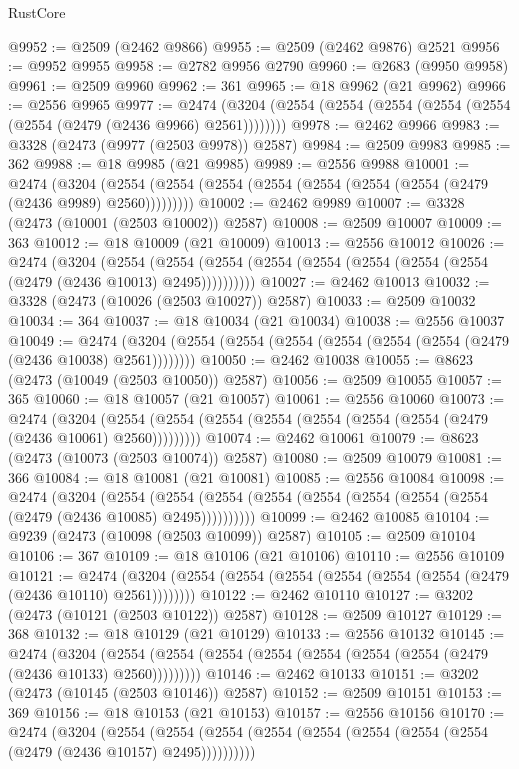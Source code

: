 \begin{lexlean}{RustCore}
\begin{coremodule}
@9952 := @2509 (@2462 @9866)
@9955 := @2509 (@2462 @9876) @2521
@9956 := @9952 @9955
@9958 := @2782 @9956 @2790
@9960 := @2683 (@9950 @9958)
@9961 := @2509 @9960
@9962 := 361
@9965 := @18 @9962 (@21 @9962)
@9966 := @2556 @9965
@9977 := @2474 (@3204 (@2554 (@2554 (@2554 (@2554 (@2554 (@2554 (@2479 (@2436 @9966) @2561))))))))
@9978 := @2462 @9966
@9983 := @3328 (@2473 (@9977 (@2503 @9978)) @2587)
@9984 := @2509 @9983
@9985 := 362
@9988 := @18 @9985 (@21 @9985)
@9989 := @2556 @9988
@10001 := @2474
    (@3204 (@2554 (@2554 (@2554 (@2554 (@2554 (@2554 (@2554 (@2479 (@2436 @9989) @2560)))))))))
@10002 := @2462 @9989
@10007 := @3328 (@2473 (@10001 (@2503 @10002)) @2587)
@10008 := @2509 @10007
@10009 := 363
@10012 := @18 @10009 (@21 @10009)
@10013 := @2556 @10012
@10026 := @2474
    (@3204
      (@2554 (@2554 (@2554 (@2554 (@2554 (@2554 (@2554 (@2554 (@2479 (@2436 @10013) @2495))))))))))
@10027 := @2462 @10013
@10032 := @3328 (@2473 (@10026 (@2503 @10027)) @2587)
@10033 := @2509 @10032
@10034 := 364
@10037 := @18 @10034 (@21 @10034)
@10038 := @2556 @10037
@10049 := @2474 (@3204 (@2554 (@2554 (@2554 (@2554 (@2554 (@2554 (@2479 (@2436 @10038) @2561))))))))
@10050 := @2462 @10038
@10055 := @8623 (@2473 (@10049 (@2503 @10050)) @2587)
@10056 := @2509 @10055
@10057 := 365
@10060 := @18 @10057 (@21 @10057)
@10061 := @2556 @10060
@10073 := @2474
    (@3204 (@2554 (@2554 (@2554 (@2554 (@2554 (@2554 (@2554 (@2479 (@2436 @10061) @2560)))))))))
@10074 := @2462 @10061
@10079 := @8623 (@2473 (@10073 (@2503 @10074)) @2587)
@10080 := @2509 @10079
@10081 := 366
@10084 := @18 @10081 (@21 @10081)
@10085 := @2556 @10084
@10098 := @2474
    (@3204
      (@2554 (@2554 (@2554 (@2554 (@2554 (@2554 (@2554 (@2554 (@2479 (@2436 @10085) @2495))))))))))
@10099 := @2462 @10085
@10104 := @9239 (@2473 (@10098 (@2503 @10099)) @2587)
@10105 := @2509 @10104
@10106 := 367
@10109 := @18 @10106 (@21 @10106)
@10110 := @2556 @10109
@10121 := @2474 (@3204 (@2554 (@2554 (@2554 (@2554 (@2554 (@2554 (@2479 (@2436 @10110) @2561))))))))
@10122 := @2462 @10110
@10127 := @3202 (@2473 (@10121 (@2503 @10122)) @2587)
@10128 := @2509 @10127
@10129 := 368
@10132 := @18 @10129 (@21 @10129)
@10133 := @2556 @10132
@10145 := @2474
    (@3204 (@2554 (@2554 (@2554 (@2554 (@2554 (@2554 (@2554 (@2479 (@2436 @10133) @2560)))))))))
@10146 := @2462 @10133
@10151 := @3202 (@2473 (@10145 (@2503 @10146)) @2587)
@10152 := @2509 @10151
@10153 := 369
@10156 := @18 @10153 (@21 @10153)
@10157 := @2556 @10156
@10170 := @2474
    (@3204
      (@2554 (@2554 (@2554 (@2554 (@2554 (@2554 (@2554 (@2554 (@2479 (@2436 @10157) @2495))))))))))

\end{coremodule}
\end{lexlean}
